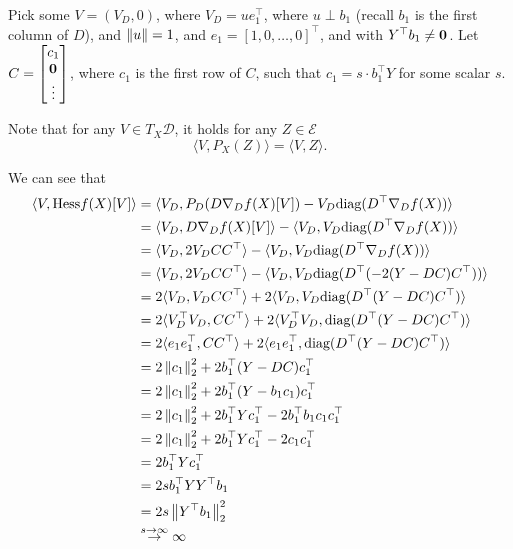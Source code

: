 \documentclass[letterpaper, 10 pt, conference, onecolumn]{ieeeconf}
\theoremstyle{definition}
\theoremstyle{plain}
\begin{document}
Pick some $V = (V_D, 0)$,
where $V_D = u e_1^\top$,
where $u\perp b_1$ (recall $b_1$ is the first column of $D$),
and $\left\lVert u \right\rVert=1$, 
and $e_1 = [1, 0, \dots, 0]^\top$,
and with $Y^\top b_1 \neq \mathbf{0}^{}$.
Let $C = \begin{bmatrix}
    c_1 \\ \mathbf{0}^{} \\ \vdots
\end{bmatrix}$, where $c_1$ is the first row of $C$, such that
$c_1 = s\cdot b_1^\top Y$ for some scalar $s$.

Note that for any $V\in T_X\mathcal{D}$, it holds for any $Z\in\mathcal{E}$
\begin{equation}
    \langle V, P_X(Z) \rangle = \langle V, Z \rangle.
\end{equation}

We can see that
\begin{align}
    \langle V, \text{Hess} f(X)[V] \rangle
    &= \langle V_D, P_D(D\nabla_D f(X)[V]) - V_D\text{diag}(D^\top \nabla_D f(X)) \rangle
    \\
    &= \langle V_D, D\nabla_D f(X)[V] \rangle - \langle V_D, V_D\text{diag}(D^\top \nabla_D f(X)) \rangle
    \\
    &= \langle V_D, 2V_DCC^\top \rangle - \langle V_D, V_D\text{diag}(D^\top \nabla_D f(X)) \rangle
    \\
    &= \langle V_D, 2V_DCC^\top \rangle - \langle V_D, V_D\text{diag}(D^\top (-2(Y-DC)C^\top)) \rangle
    \\
    &= 2 \langle V_D, V_DCC^\top \rangle + 2 \langle V_D, V_D\text{diag}(D^\top (Y-DC)C^\top) \rangle
    \\
    &= 2 \langle V_D^\top V_D, CC^\top \rangle + 2 \langle V_D^\top V_D, \text{diag}(D^\top (Y-DC)C^\top) \rangle
    \\
    &= 2 \langle e_1 e_1^\top, CC^\top \rangle + 2 \langle e_1 e_1^\top, \text{diag}(D^\top (Y-DC)C^\top) \rangle
    \\
    &= 2 \left\lVert c_1 \right\rVert_2^2 + 2 b_1^\top (Y-DC) c_1^\top
    \\
    &= 2 \left\lVert c_1 \right\rVert_2^2 + 2 b_1^\top (Y-b_1 c_1) c_1^\top
    \\
    &= 2 \left\lVert c_1 \right\rVert_2^2 + 2 b_1^\top Yc_1^\top - 2 b_1^\top b_1 c_1 c_1^\top
    \\
    &= 2 \left\lVert c_1 \right\rVert_2^2 + 2 b_1^\top Yc_1^\top - 2 c_1 c_1^\top 
    \\
    &= 2 b_1^\top Y c_1^\top
    \\
    &= 2 s b_1^\top Y Y^\top b_1
    \\
    &= 2 s \left\lVert Y^\top b_1 \right\rVert_2^2
    \\
    &\overset{s\to\infty}{\to} \infty
\end{align}
\end{document}

